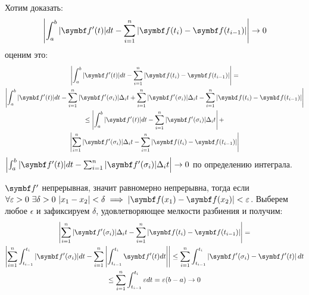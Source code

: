 \documentclass[main]{subfiles}
\begin{document}
\begin{longProof}
    Хотим доказать:
    \[\left| \int_a^b |\vf'(t)| dt - \sum_{i=1}^n |\vf(t_i) - \vf(t_{i-1})|\right| \to 0\]
    оценим это:
    \begin{multline*}
        \left| \int_a^b |\vf'(t)| dt - \sum_{i=1}^n |\vf(t_i) - \vf(t_{i-1})|\right| = \\
        \left| \int_a^b |\vf'(t)| dt - \sum_{i=1}^n |\vf'(\sigma_i)| \Delta_i t  + \sum_{i=1}^n |\vf' (\sigma_i)| \Delta_i t - \sum_{i=1}^n |\vf(t_i) - \vf(t_{i-1})| \right| \\
        \le \left| \int_a^b |\vf'(t)| dt - \sum_{i=1}^n |\vf'(\sigma_i)| \Delta_i t \right|  +\\
        \left| \sum_{i=1}^n |\vf' (\sigma_i)| \Delta_i t - \sum_{i=1}^n |\vf(t_i) - \vf(t_{i-1})| \right|
    \end{multline*}
    $\left| \int_a^b |\vf'(t)| dt - \sum_{i=1}^n |\vf'(\sigma_i)| \Delta_i t \right| \to 0$ по определению интеграла.

    $\vf'$ непрерывная, значит равномерно непрерывна, тогда если
    $\forall \epsilon > 0\  \exists \delta > 0\  |x_1 - x_2| < \delta \implies |\vf(x_1) - \vf(x_2)| < \epsilon$.
    Выберем любое $\epsilon$ и зафиксируем $\delta$, удовлетворяющее мелкости разбиения и получим:
    \begin{multline*}
        \left| \sum_{i=1}^n |\vf' (\sigma_i)| \Delta_i t - \sum_{i=1}^n |\vf(t_i) - \vf(t_{i-1})| \right| =\\
        \left|\sum_{i=1}^n \int_{t_{i-1}}^{t_i} |\vf'(\sigma_i)|dt -  \sum_{i=1}^n \left|\int_{t_{i-1}}^{t_i} \vf'(t)dt\right|\right|
        \le \sum_{i=1}^n \int_{t_{i-1}}^{t_i} \left|\vf'(\sigma_i) - \vf'(t) \right|dt \\
        \le \sum_{i=1}^n \int_{t_{i-1}}^{t_i} \epsilon dt = \epsilon (b-a) \to 0
    \end{multline*}
\end{longProof}
\end{document}
